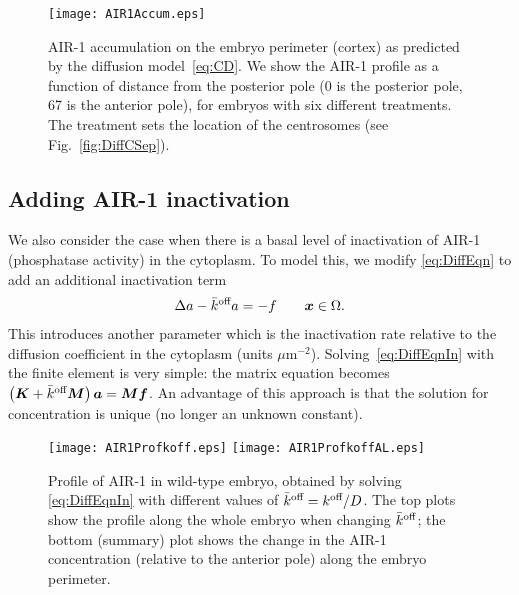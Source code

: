\documentclass[11pt]{article}
\newcommand{\V}[1]{\boldsymbol{#1}}                 %
\newcommand{\M}[1]{\boldsymbol{#1}}
\begin{document}
\begin{figure}
\centering
\texttt{[image: AIR1Accum.eps]}
\caption{\label{fig:AIR1Acc}AIR-1 accumulation on the embryo perimeter (cortex) as predicted by the diffusion model\ \eqref{eq:CD}. We show the AIR-1 profile as a function of distance from the posterior pole (0 is the posterior pole, 67 is the anterior pole), for embryos with six different treatments. The treatment sets the location of the centrosomes (see Fig.\ \ref{fig:DiffCSep}).}
\end{figure}

\subsection{Adding AIR-1 inactivation \label{sec:inact}}
We also consider the case when there is a basal level of inactivation of AIR-1 (phosphatase activity) in the cytoplasm. To model this, we modify \eqref{eq:DiffEqn} to add an additional inactivation term
\begin{gather}
\label{eq:DiffEqnIn}
\Delta a -\koffb a=  -f \qquad \V{x} \in \Omega.
\end{gather} 
This introduces another parameter which is the inactivation rate relative to the diffusion coefficient in the cytoplasm (units $\mu$m$^{-2}$). Solving\ \eqref{eq:DiffEqnIn} with the finite element is very simple: the matrix equation becomes $\left(\M K + \koffb \M M \right) \V a = \M M \V f$. An advantage of this approach is that the solution for concentration is unique (no longer an unknown constant).

\begin{figure}
\centering
\texttt{[image: AIR1Profkoff.eps]}
\texttt{[image: AIR1ProfkoffAL.eps]}
\caption{\label{fig:AIR1ProfKoff} Profile of AIR-1 in wild-type embryo, obtained by solving \eqref{eq:DiffEqnIn} with different values of $\bar{k}^\text{off}=k^\text{off}/D$. The top plots show the profile along the whole embryo when changing $\bar{k}^\text{off}$; the bottom (summary) plot shows the change in the AIR-1 concentration (relative to the anterior pole) along the embryo perimeter.}
\end{figure}
\end{document}
